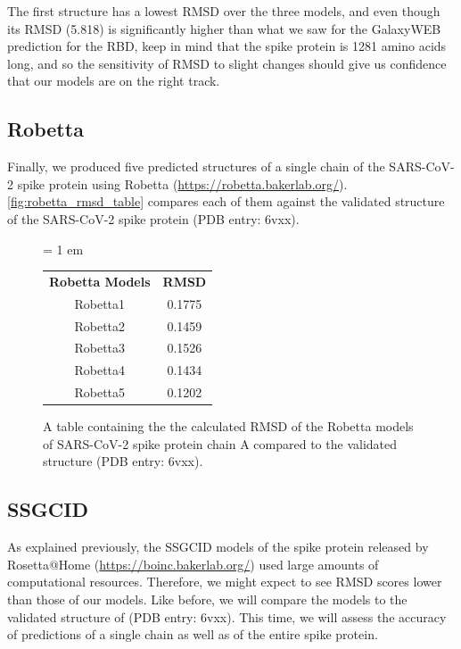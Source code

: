 The first structure has a lowest RMSD over the three models, and even though its RMSD (5.818) is significantly higher than what we saw for the GalaxyWEB prediction for the RBD, keep in mind that the spike protein is 1281 amino acids long, and so the sensitivity of RMSD to slight changes should give us confidence that our models are on the right track.

\FloatBarrier
{}
\subsection{Robetta}

Finally, we produced five predicted structures of a single chain of the SARS-CoV-2 spike protein using Robetta (\url{https://robetta.bakerlab.org/}). \autoref{fig:robetta_rmsd_table} compares each of them against the validated structure of the SARS-CoV-2 spike protein (PDB entry: 6vxx).\\

\begin{figure}[h]
	\centering
	\tabcolsep = 1 em
	\mySfFamily
	\begin{tabular}{c c}
		\textbf{Robetta Models} & \textbf{RMSD} \\
		Robetta1 & 0.1775 \\
		Robetta2 & 0.1459 \\
		Robetta3 & 0.1526 \\
		Robetta4 & 0.1434 \\
		Robetta5 & 0.1202 \\
	\end{tabular}
	\caption{A table containing the the calculated RMSD of the Robetta models of SARS-CoV-2 spike protein chain A compared to the validated structure (PDB entry: 6vxx).}
	\label{fig:robetta_rmsd_table}
\end{figure}

\begin{qbox}\end{qbox}

\FloatBarrier
{}
\subsection{SSGCID}

As explained previously, the SSGCID models of the spike protein released by Rosetta@Home (\url{https://boinc.bakerlab.org/}) used large amounts of computational resources. Therefore, we might expect to see RMSD scores lower than those of our models. Like before, we will compare the models to the validated structure of (PDB entry: 6vxx). This time, we will assess the accuracy of predictions of a single chain as well as of the entire spike protein.

